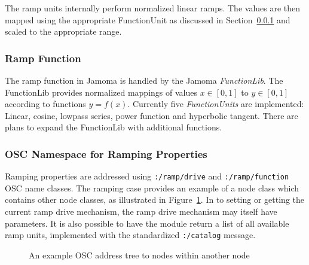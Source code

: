 \documentclass{NIME-alternate}
\begin{document}
The ramp units internally perform normalized linear ramps. The values are then mapped using the appropriate FunctionUnit as discussed in Section~\ref{ssub:the_function_lib} and scaled to the appropriate range. 



\subsubsection{Ramp Function} %
\label{ssub:the_function_lib}

The ramp function in Jamoma is handled by the Jamoma \emph{FunctionLib}.  The FunctionLib provides normalized mappings of values $x \in [0,1]$ to $y \in [0,1]$ according to functions $y = f(x)$. Currently five \emph{FunctionUnits} are implemented: Linear, cosine, lowpass series, power function and hyperbolic tangent. There are plans to expand the FunctionLib with additional functions.



\subsubsection{OSC Namespace for Ramping Properties} %
\label{ssub:osc_namespace_for_ramping_properties}
Ramping properties are addressed using \texttt{:/ramp/drive} and \texttt{:/ramp/function} OSC name classes. The ramping case provides an example of a node class which contains other node classes, as illustrated in Figure~\ref{fig:embedded}. In to setting or getting the current ramp drive mechanism, the ramp drive mechanism may itself have parameters. It is also possible to have the module return a list of all available ramp units, implemented with the standardized \texttt{:/catalog} message.

\begin{figure}
\centerline{}
\caption{An example OSC address tree to nodes within another node}
\label{fig:embedded}
\end{figure}
\end{document}
